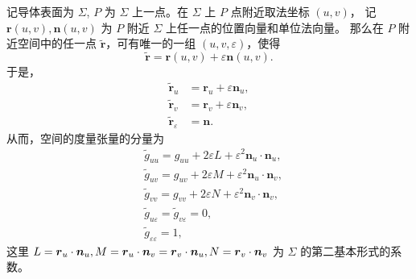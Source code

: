 \begin{enumerate}

记导体表面为 $\Sigma$, $P$ 为 $\Sigma$ 上一点。在 $\Sigma$ 上 $P$ 点附近取法坐标 $(u, v)$，
记 $\boldsymbol{r}(u, v), \boldsymbol{n}(u, v)$ 为 $P$ 附近 $\Sigma$ 上任一点的位置向量和单位法向量。
那么在 $P$ 附近空间中的任一点 $\widetilde{\boldsymbol{r}}$，可有唯一的一组 $(u, v, \varepsilon)$，使得
$$\widetilde{\boldsymbol{r}}=\boldsymbol{r}(u, v)+\varepsilon \boldsymbol{n}(u, v).$$
于是，
\begin{align*}
\widetilde{\boldsymbol{r}}_{u} & =\boldsymbol{r}_{u}+\varepsilon \boldsymbol{n}_{u}, \\
\widetilde{\boldsymbol{r}}_{v} & =\boldsymbol{r}_{v}+\varepsilon \boldsymbol{n}_{v}, \\
\widetilde{\boldsymbol{r}}_{\varepsilon} & =\boldsymbol{n}.
\end{align*}
从而，空间的度量张量的分量为
\begin{align*}
& \widetilde{g}_{uu}=g_{uu}+2 \varepsilon L+\varepsilon^{2} \boldsymbol{n}_{u} \cdot \boldsymbol{n}_{u}, \\
& \widetilde{g}_{uv}=g_{uv}+2 \varepsilon M+\varepsilon^{2} \boldsymbol{n}_{u} \cdot \boldsymbol{n}_{v}, \\
& \widetilde{g}_{vv}=g_{vv}+2 \varepsilon N+\varepsilon^{2} \boldsymbol{n}_{v} \cdot \boldsymbol{n}_{v}, \\
& \widetilde{g}_{u\varepsilon}=\widetilde{g}_{v\varepsilon}=0, \\
& \widetilde{g}_{\varepsilon\varepsilon}=1,
\end{align*}
这里 $L=\boldsymbol{r}_{u}\cdot\boldsymbol{n}_{u}, M=\boldsymbol{r}_{u}\cdot\boldsymbol{n}_{v}=\boldsymbol{r}_{v}\cdot\boldsymbol{n}_{u}, N=\boldsymbol{r}_{v}\cdot\boldsymbol{n}_{v}$ 为 $\Sigma$ 的第二基本形式的系数。


\end{enumerate}
